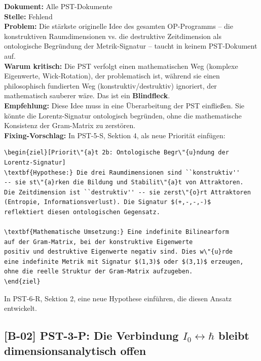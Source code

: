 \documentclass[11pt,a4paper]{article}
\newcommand{\B}[1]{\textbf{[B-#1]}}
\newcommand{\Dok}[1]{\textbf{Dokument:} #1\\}
\newcommand{\Stelle}[1]{\textbf{Stelle:} #1\\}
\newcommand{\Prob}[1]{\textbf{Problem:} #1\\}
\newcommand{\Krit}[1]{\textbf{Warum kritisch:} #1\\}
\newcommand{\Empf}[1]{\textbf{Empfehlung:} #1\\}
\newcommand{\Fix}[1]{\textbf{Fixing-Vorschlag:} #1\\}
\begin{document}
\Dok{Alle PST-Dokumente}
\Stelle{Fehlend}
\Prob{Die st\"{a}rkste originelle Idee des gesamten OP-Programms --
die konstruktiven Raumdimensionen vs. die destruktive Zeitdimension
als ontologische Begr\"{u}ndung der Metrik-Signatur -- taucht in
keinem PST-Dokument auf.}
\Krit{Die PST verfolgt einen mathematischen Weg (komplexe
Eigenwerte, Wick-Rotation), der problematisch ist, w\"{a}hrend sie
einen philosophisch fundierten Weg (konstruktiv/destruktiv)
ignoriert, der mathematisch sauberer w\"{a}re. Das ist ein
\textbf{Blindfleck}.}
\Empf{Diese Idee muss in eine \"{U}berarbeitung der PST
einflie\ss{}en. Sie k\"{o}nnte die Lorentz-Signatur ontologisch
begr\"{u}nden, ohne die mathematische Konsistenz der Gram-Matrix zu
zerst\"{o}ren.}
\Fix{In PST-5-S, Sektion 4, als neue Priorit\"{a}t einf\"{u}gen:
\begin{verbatim}
\begin{ziel}[Priorit\"{a}t 2b: Ontologische Begr\"{u}ndung der
Lorentz-Signatur]
\textbf{Hypothese:} Die drei Raumdimensionen sind ``konstruktiv''
-- sie st\"{a}rken die Bildung und Stabilit\"{a}t von Attraktoren.
Die Zeitdimension ist ``destruktiv'' -- sie zerst\"{o}rt Attraktoren
(Entropie, Informationsverlust). Die Signatur $(+,-,-,-)$
reflektiert diesen ontologischen Gegensatz.

\textbf{Mathematische Umsetzung:} Eine indefinite Bilinearform
auf der Gram-Matrix, bei der konstruktive Eigenwerte
positiv und destruktive Eigenwerte negativ sind. Dies w\"{u}rde
eine indefinite Metrik mit Signatur $(1,3)$ oder $(3,1)$ erzeugen,
ohne die reelle Struktur der Gram-Matrix aufzugeben.
\end{ziel}
\end{verbatim}
In PST-6-R, Sektion 2, eine neue Hypothese einf\"{u}hren, die diesen
Ansatz entwickelt.}

\subsection{\B{02} PST-3-P: Die Verbindung $I_0 \leftrightarrow \hbar$
bleibt dimensionsanalytisch offen}
\end{document}
